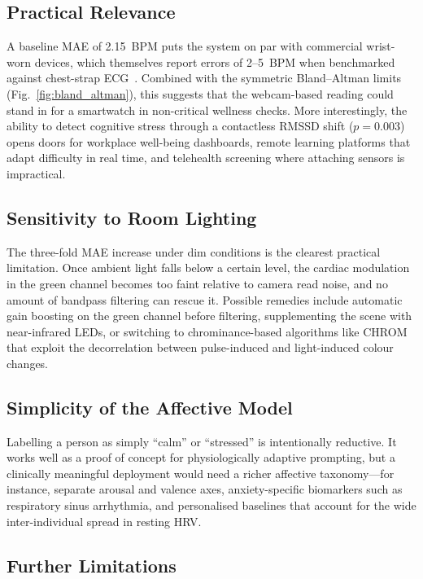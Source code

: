 \documentclass[conference]{IEEEtran}
\begin{document}
\subsection{Practical Relevance}

A baseline MAE of 2.15~BPM puts the system on par with commercial
wrist-worn devices, which themselves report errors of 2--5~BPM
when benchmarked against chest-strap
ECG~\cite{bent2020investigating}. Combined with the symmetric
Bland--Altman limits (Fig.~\ref{fig:bland_altman}), this suggests
that the webcam-based reading could stand in for a smartwatch in
non-critical wellness checks. More interestingly, the ability to
detect cognitive stress through a contactless RMSSD shift
($p = 0.003$) opens doors for workplace well-being dashboards,
remote learning platforms that adapt difficulty in real
time, and telehealth screening where attaching sensors is
impractical.

\subsection{Sensitivity to Room Lighting}

The three-fold MAE increase under dim conditions is the clearest
practical limitation. Once ambient light falls below a certain
level, the cardiac modulation in the green channel becomes too
faint relative to camera read noise, and no amount of bandpass
filtering can rescue it. Possible remedies include automatic gain
boosting on the green channel before filtering, supplementing the
scene with near-infrared LEDs, or switching to chrominance-based
algorithms like CHROM~\cite{dehaan2013robust} that exploit the
decorrelation between pulse-induced and light-induced colour
changes.

\subsection{Simplicity of the Affective Model}

Labelling a person as simply ``calm'' or ``stressed'' is
intentionally reductive. It works well as a proof of concept for
physiologically adaptive prompting, but a clinically meaningful
deployment would need a richer affective taxonomy---for instance,
separate arousal and valence axes, anxiety-specific biomarkers
such as respiratory sinus arrhythmia, and personalised baselines
that account for the wide inter-individual spread in resting HRV.

\subsection{Further Limitations}
\end{document}
